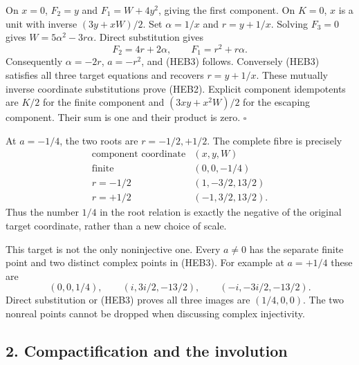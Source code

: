 \documentclass[
  10pt,
  a4paper,
]{article}
\begin{document}
On \(x=0\), \(F_2=y\) and \(F_1=W+4y^2\), giving the first component. On
\(K=0\), \(x\) is a unit with inverse \((3y+xW)/2\). Set \(\alpha=1/x\)
and \(r=y+1/x\). Solving \(F_3=0\) gives \(W=5\alpha^2-3r\alpha\).
Direct substitution gives \[
F_2=4r+2\alpha,\qquad F_1=r^2+r\alpha.
\tag{HEB4}
\] Consequently \(\alpha=-2r\), \(a=-r^2\), and (HEB3) follows.
Conversely (HEB3) satisfies all three target equations and recovers
\(r=y+1/x\). These mutually inverse coordinate substitutions prove
(HEB2). Explicit component idempotents are \(K/2\) for the finite
component and \((3xy+x^2W)/2\) for the escaping component. Their sum is
one and their product is zero. \(\square\)

At \(a=-1/4\), the two roots are \(r=-1/2,+1/2\). The complete fibre is
precisely \[
\begin{array}{c|c}
\text{component coordinate}&(x,y,W)\\\hline
\text{finite}&(0,0,-1/4)\\
r=-1/2&(1,-3/2,13/2)\\
r=+1/2&(-1,3/2,13/2).
\end{array}\tag{HEB5}
\] Thus the number \(1/4\) in the root relation is exactly the negative
of the original target coordinate, rather than a new choice of scale.

This target is not the only noninjective one. Every \(a\ne0\) has the
separate finite point and two distinct complex points in (HEB3). For
example at \(a=+1/4\) these are \[
(0,0,1/4),\qquad(i,3i/2,-13/2),\qquad(-i,-3i/2,-13/2).
\tag{HEB6}
\] Direct substitution or (HEB3) proves all three images are
\((1/4,0,0)\). The two nonreal points cannot be dropped when discussing
complex injectivity.

\subsection{2. Compactification and the
involution}\label{compactification-and-the-involution}
\end{document}

